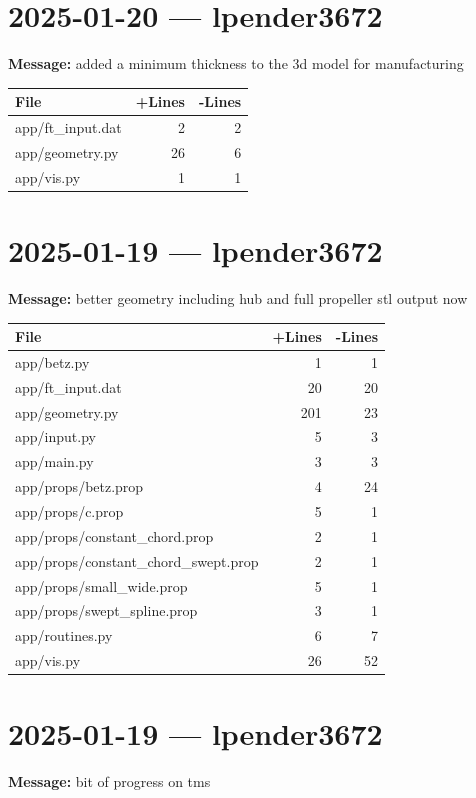 \documentclass{article}
\begin{document}
\section*{2025-01-20 --- lpender3672}
\textbf{Message:} added a minimum thickness to the 3d model for manufacturing

\begin{longtable}{|p{10cm}|r|r|}
\hline \textbf{File} & \textbf{+Lines} & \textbf{-Lines} \\
\hline
app/ft\_input.dat & 2 & 2 \\
\hline
app/geometry.py & 26 & 6 \\
\hline
app/vis.py & 1 & 1 \\
\hline
\end{longtable}

\section*{2025-01-19 --- lpender3672}
\textbf{Message:} better geometry including hub and full propeller stl output now

\begin{longtable}{|p{10cm}|r|r|}
\hline \textbf{File} & \textbf{+Lines} & \textbf{-Lines} \\
\hline
app/betz.py & 1 & 1 \\
\hline
app/ft\_input.dat & 20 & 20 \\
\hline
app/geometry.py & 201 & 23 \\
\hline
app/input.py & 5 & 3 \\
\hline
app/main.py & 3 & 3 \\
\hline
app/props/betz.prop & 4 & 24 \\
\hline
app/props/c.prop & 5 & 1 \\
\hline
app/props/constant\_chord.prop & 2 & 1 \\
\hline
app/props/constant\_chord\_swept.prop & 2 & 1 \\
\hline
app/props/small\_wide.prop & 5 & 1 \\
\hline
app/props/swept\_spline.prop & 3 & 1 \\
\hline
app/routines.py & 6 & 7 \\
\hline
app/vis.py & 26 & 52 \\
\hline
\end{longtable}

\section*{2025-01-19 --- lpender3672}
\textbf{Message:} bit of progress on tms
\end{document}
